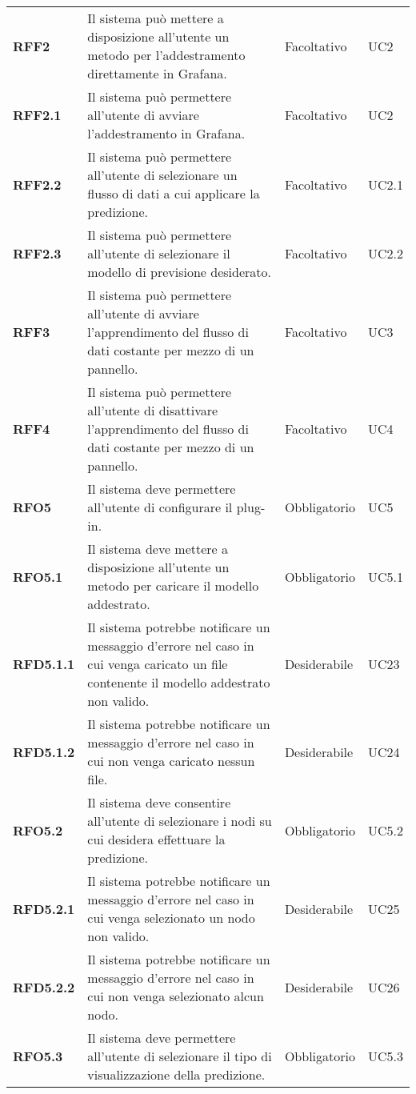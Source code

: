 \begin{longtable}[H]{>{\centering\bfseries}m{2cm} >{\centering}m{9cm} >{\centering}m{2.5cm} >{\centering\arraybackslash}m{2.5cm}}
  \textbf{RFF2} & Il sistema può mettere a disposizione all'utente un metodo per l’addestramento direttamente in Grafana. & Facoltativo & UC2 \\
  \textbf{RFF2.1} & Il sistema può permettere all’utente di avviare l’addestramento in Grafana. & Facoltativo & UC2 \\
  \textbf{RFF2.2} & Il sistema può permettere all'utente di selezionare un flusso di dati a cui applicare la predizione. & Facoltativo & UC2.1 \\
  \textbf{RFF2.3} & Il sistema può permettere all’utente di selezionare il modello di previsione desiderato. & Facoltativo & UC2.2 \\
  \textbf{RFF3} & Il sistema può permettere all'utente di avviare l'apprendimento del flusso di dati costante per mezzo di un pannello. & Facoltativo & UC3 \\
  \textbf{RFF4} & Il sistema può permettere all'utente di disattivare l'apprendimento del flusso di dati costante per mezzo di un pannello. & Facoltativo & UC4 \\
  \textbf{RFO5} & Il sistema deve permettere all’utente di configurare il plug-in. & Obbligatorio & UC5 \\
  \textbf{RFO5.1} & Il sistema deve mettere a disposizione all’utente un metodo per caricare il modello addestrato. & Obbligatorio & UC5.1 \\
  \textbf{RFD5.1.1} & Il sistema potrebbe notificare un messaggio d'errore nel caso in cui venga caricato un file contenente il modello addestrato non valido. & Desiderabile & UC23 \\
  \textbf{RFD5.1.2} & Il sistema potrebbe notificare un messaggio d'errore nel caso in cui non venga caricato nessun file. & Desiderabile & UC24 \\
  \textbf{RFO5.2} & Il sistema deve consentire all’utente di selezionare i nodi su cui desidera effettuare la predizione. & Obbligatorio & UC5.2 \\
  \textbf{RFD5.2.1} & Il sistema potrebbe notificare un messaggio d'errore nel caso in cui venga selezionato un nodo non valido. & Desiderabile & UC25 \\
  \textbf{RFD5.2.2} & Il sistema potrebbe notificare un messaggio d'errore nel caso in cui non venga selezionato alcun nodo. & Desiderabile & UC26 \\
  \textbf{RFO5.3} & Il sistema deve permettere all’utente di selezionare il tipo di visualizzazione della predizione. & Obbligatorio & UC5.3 \\

\end{longtable}
